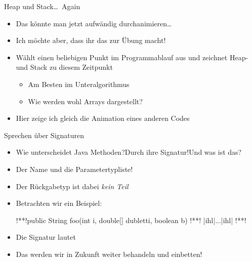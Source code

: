 {\AddonFrame
\begin{frame}{Heap und Stack\ldots\ Again}
    \begin{itemize}[<+(1)->]
        \itemsep12pt
        \item Das könnte man jetzt aufwändig durchanimieren\ldots
        \item Ich möchte aber, dass ihr das zur Übung macht!
        \item Wählt einen beliebigen  Punkt im Programmablauf aus und zeichnet Heap- und Stack zu diesem Zeitpunkt \begin{itemize}
            \item Am Besten im Unteralgorithmus
            \item Wie werden wohl  Arrays dargestellt?
        \end{itemize}
        \item Hier zeige ich gleich die Animation eines anderen Codes 
    \end{itemize}
\end{frame}
\begin{frame}[fragile]{Sprechen über Signaturen}
\SetupLstHl
\begin{itemize}[<+(1)->]
    \itemsep6pt
    \item Wie unterscheidet Java Methoden?\quad\pause Durch ihre Signatur!\quad\pause Und was ist das?
    \item Der Name und die Parametertypliste!\quad {}
    \item Der Rückgabetyp ist dabei \textit{kein Teil} 
    \item Betrachten wir ein Beispiel:
\begin{plainjava}[aboveskip=0pt]
!**!public String foo(int i, double[] dubletti, boolean b) {
!**!    |ihl|...|ihl|
!**!}
\end{plainjava}
    \item<10-> Die Signatur lautet 
    \item<11-> Das werden wir in Zukunft weiter behandeln und einbetten!
\end{itemize}
\end{frame}

}
